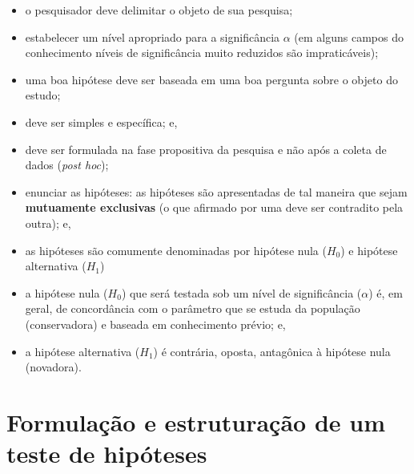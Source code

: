 \documentclass[
]{book}
\providecommand{\tightlist}{%
  \setlength{\itemsep}{0pt}\setlength{\parskip}{0pt}}
\begin{document}
\begin{itemize}
\tightlist
\item
  o pesquisador deve delimitar o objeto de sua pesquisa;\\
\item
  estabelecer um nível apropriado para a significância \(\alpha\) (em alguns campos do conhecimento níveis de significância muito reduzidos são impraticáveis);
\item
  uma boa hipótese deve ser baseada em uma boa pergunta sobre o objeto do estudo;
\item
  deve ser simples e específica; e,
\item
  deve ser formulada na fase propositiva da pesquisa e não após a coleta de dados (\emph{post hoc});
\item
  enunciar as hipóteses: as hipóteses são apresentadas de tal maneira que sejam \textbf{mutuamente exclusivas} (o que afirmado por uma deve ser contradito pela outra); e,\\
\item
  as hipóteses são comumente denominadas por hipótese nula (\(H_{0}\)) e hipótese alternativa (\(H_{1}\))
\item
  a hipótese nula (\(H_{0}\)) que será testada sob um nível de significância (\(\alpha\)) é, em geral, de concordância com o parâmetro que se estuda da população (conservadora) e baseada em conhecimento prévio; e,
\item
  a hipótese alternativa (\(H_{1}\)) é contrária, oposta, antagônica à hipótese nula (novadora).
\end{itemize}

\hypertarget{formulauxe7uxe3o-e-estruturauxe7uxe3o-de-um-teste-de-hipuxf3teses}{%
\section{Formulação e estruturação de um teste de hipóteses}\label{formulauxe7uxe3o-e-estruturauxe7uxe3o-de-um-teste-de-hipuxf3teses}}
\end{document}
